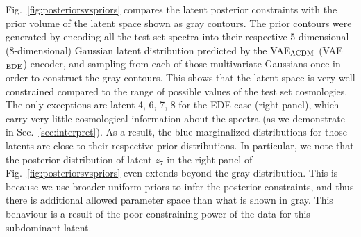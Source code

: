 \documentclass[aps, prd, reprint, superscriptaddress, nofootinbib, bibnotes]{revtex4-2}
\begin{document}
Fig.~\ref{fig:posteriorsvspriors} compares the latent posterior constraints with the prior volume of the latent space shown as gray contours. The prior contours were generated by encoding all the test set spectra into their respective 5-dimensional (8-dimensional) Gaussian latent distribution predicted by the VAE$_{\Lambda\rm{CDM}}$ (VAE$_{\rm EDE}$) encoder, and sampling from each of those multivariate Gaussians once in order to construct the gray contours. This shows that the latent space is very well constrained compared to the range of possible values of the test set cosmologies. The only exceptions are latent 4, 6, 7, 8 for the EDE case (right panel), which carry very little cosmological information about the spectra (as we demonstrate in Sec.~\ref{sec:interpret}).  As a result, the blue marginalized distributions for those latents are close to their respective prior distributions. In particular, we note that the posterior distribution of latent $z_7$ in the right panel of Fig.~\ref{fig:posteriorsvspriors} even extends beyond the gray distribution. This is because we use broader uniform priors to infer the posterior constraints, and thus there is additional allowed parameter space than what is shown in gray. This behaviour is a result of the poor constraining power of the data for this subdominant latent.

\end{document}

